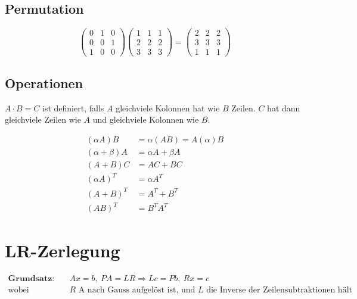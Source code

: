 \documentclass[11pt]{article}
\begin{document}
\subsection{Permutation}

\begin{equation*}
	\begin{pmatrix}
		0 & 1 & 0 \\ 0 & 0 & 1 \\ 1 & 0 & 0
	\end{pmatrix}\begin{pmatrix}
		1 & 1 & 1 \\ 2 & 2 & 2 \\ 3 & 3 & 3
	\end{pmatrix} = \begin{pmatrix}
		2 & 2 & 2 \\ 3 & 3 & 3 \\ 1 & 1 & 1
	\end{pmatrix}
\end{equation*}

\subsection{Operationen}

$A \cdot B = C$ ist definiert, falls $A$ gleichviele Kolonnen hat wie $B$ Zeilen. $C$ hat dann gleichviele Zeilen wie $A$ und gleichviele Kolonnen wie $B$.

\begin{equation*}
\begin{split}
	(\alpha A)B & = \alpha(AB) = A(\alpha)B \\
	(\alpha + \beta)A & = \alpha A + \beta A \\
	(A +B) C & = AC + BC \\
	(\alpha A)^T & = \alpha A^T \\
	(A + B) ^ T & = A^T + B^T \\
	(AB)^T & = B^T A^T
\end{split}
\end{equation*}
	
\section{LR-Zerlegung}

\begin{equation*}
\begin{split}
	\textbf{Grundsatz:} \quad & Ax = b,\ PA = LR \Rightarrow Lc = Pb,\ Rx = c \\
	\text{wobei} \quad & \text{$R$ A nach Gauss aufgel{\"o}st ist, und $L$ die Inverse der Zeilensubtraktionen h{\"a}lt}
\end{split}
\end{equation*}
\end{document}
